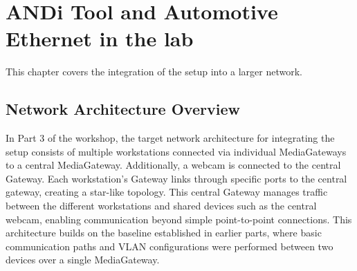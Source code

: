 \section{ANDi Tool and Automotive Ethernet in the lab }
\label{sec:network-integration}

This chapter covers the integration of the setup into a larger network.

\subsection{Network Architecture Overview}
In Part 3 of the workshop, the target network architecture for integrating the setup consists of multiple workstations connected via individual MediaGateways to a central MediaGateway. Additionally, a webcam is connected to the central Gateway. Each workstation’s Gateway links through specific ports to the central gateway, creating a star-like topology. This central Gateway manages traffic between the different workstations and shared devices such as the central webcam, enabling communication beyond simple point-to-point connections. This architecture builds on the baseline established in earlier parts, where basic communication paths and VLAN configurations were performed between two devices over a single MediaGateway.

